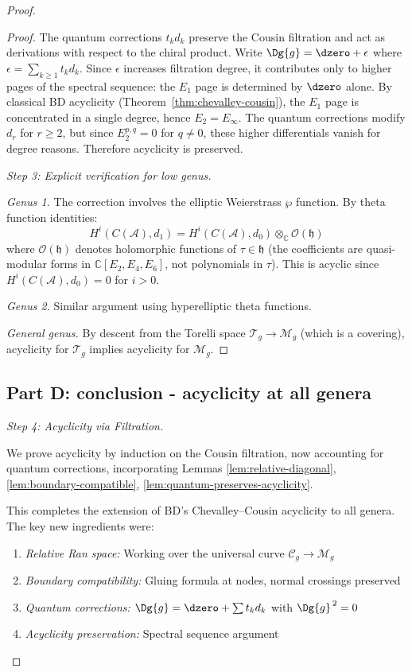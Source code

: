 \begin{proof}
\begin{proof}
The quantum corrections $t_k d_k$ preserve the Cousin filtration and act as derivations with respect to the chiral product. Write $\Dg{g} = \dzero + \epsilon$ where $\epsilon = \sum_{k \geq 1} t_k d_k$. Since $\epsilon$ increases filtration degree, it contributes only to higher pages of the spectral sequence: the $E_1$ page is determined by $\dzero$ alone. By classical BD acyclicity (Theorem~\ref{thm:chevalley-cousin}), the $E_1$ page is concentrated in a single degree, hence $E_2 = E_\infty$. The quantum corrections modify $d_r$ for $r \geq 2$, but since $E_2^{p,q} = 0$ for $q \neq 0$, these higher differentials vanish for degree reasons. Therefore acyclicity is preserved.

\emph{Step 3: Explicit verification for low genus.}

\emph{Genus 1.} The correction involves the elliptic Weierstrass $\wp$ function. By theta function identities:
\[H^i(C(\mathcal{A}), d_1) = H^i(C(\mathcal{A}), d_0) \otimes_\mathbb{C} \mathcal{O}(\mathfrak{h})\]
where $\mathcal{O}(\mathfrak{h})$ denotes holomorphic functions of $\tau \in \mathfrak{h}$ (the coefficients are quasi-modular forms in $\mathbb{C}[E_2, E_4, E_6]$, not polynomials in $\tau$). This is acyclic since $H^i(C(\mathcal{A}), d_0) = 0$ for $i > 0$.

\emph{Genus 2.} Similar argument using hyperelliptic theta functions.

\emph{General genus.} By descent from the Torelli space $\mathcal{T}_g \to \mathcal{M}_g$ (which is a covering), acyclicity for $\mathcal{T}_g$ implies acyclicity for $\mathcal{M}_g$.
\end{proof}

\subsection*{Part D: conclusion - acyclicity at all genera}

\emph{Step 4: Acyclicity via Filtration.}

We prove acyclicity by induction on the Cousin filtration, now accounting for quantum corrections, incorporating Lemmas \ref{lem:relative-diagonal}, \ref{lem:boundary-compatible}, \ref{lem:quantum-preserves-acyclicity}.

\begin{remark}\label{rem:summary-higher-genus}
This completes the extension of BD's Chevalley--Cousin acyclicity to all genera. The key new ingredients were:
\begin{enumerate}
\item \emph{Relative Ran space:} Working over the universal curve $\mathcal{C}_g \to \mathcal{M}_g$
\item \emph{Boundary compatibility:} Gluing formula at nodes, normal crossings preserved
\item \emph{Quantum corrections:} $\Dg{g} = \dzero + \sum t_k d_k$ with $\Dg{g}^{\,2} = 0$
\item \emph{Acyclicity preservation:} Spectral sequence argument
\end{enumerate}


\end{remark}
\end{proof}
